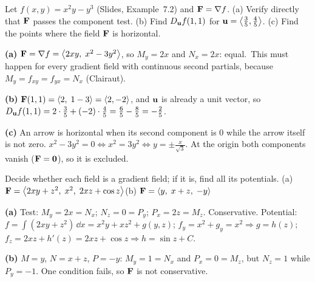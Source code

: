 \begin{problem}\label{q:mixed2}
Let $f(x,y)=x^2y-y^3$ (Slides, Example~7.2) and $\mathbf{F}=\nabla f$.
(a) Verify directly that $\mathbf{F}$ passes the component test.
(b) Find $D_{\mathbf{u}}f(1,1)$ for $\mathbf{u}=\left\langle \frac35,\frac45 \right\rangle$.
(c) Find the points where the field $\mathbf{F}$ is horizontal.
\end{problem}
\begin{solution}
\textbf{(a)} $\mathbf{F}=\nabla f=\left\langle 2xy,\;x^2-3y^2 \right\rangle$, so $M_y=2x$ and $N_x=2x$: equal.\checkok\ This must
happen for every gradient field with continuous second partials, because
$M_y=f_{xy}=f_{yx}=N_x$ (Clairaut).

\textbf{(b)} $\mathbf{F}(1,1)=\left\langle 2,\;1-3 \right\rangle=\left\langle 2,-2 \right\rangle$, and $\mathbf{u}$ is already a unit vector, so
$D_{\mathbf{u}} f(1,1)=2\cdot\frac35+(-2)\cdot\frac45=\frac65-\frac85=-\frac25$.

\textbf{(c)} An arrow is horizontal when its second component is $0$ while the arrow itself is
not zero. $x^2-3y^2=0\iff x^2=3y^2\iff y=\pm\frac{x}{\sqrt3}$. At the origin both components vanish
($\mathbf{F}=\mathbf{0}$), so it is excluded.
\end{solution}

\begin{problem}\label{q:mixed3}
Decide whether each field is a gradient field; if it is, find all its
potentials. (a) $\mathbf{F}=\left\langle 2xy+z^2,\;x^2,\;2xz+\cos z \right\rangle$\quad (b) $\mathbf{F}=\left\langle y,\;x+z,\;-y \right\rangle$
\end{problem}
\begin{solution}
\textbf{(a)} Test: $M_y=2x=N_x$; $N_z=0=P_y$; $P_x=2z=M_z$. Conservative. Potential:
$f=\int(2xy+z^2)\,\dd x=x^2y+xz^2+g(y,z)$; $f_y=x^2+g_y=x^2\Rightarrow g=h(z)$;
$f_z=2xz+h'(z)=2xz+\cos z\Rightarrow h=\sin z+C$.

\textbf{(b)} $M=y$, $N=x+z$, $P=-y$: $M_y=1=N_x$ and $P_x=0=M_z$, but $N_z=1$ while $P_y=-1$.
One condition fails, so $\mathbf{F}$ is not conservative.
\end{solution}
